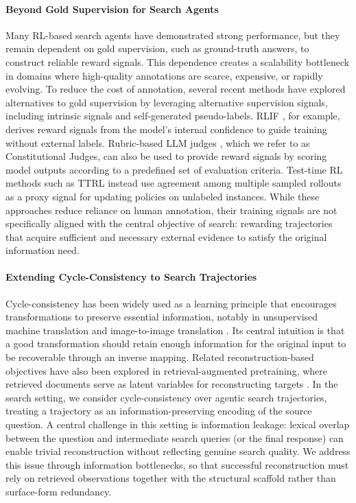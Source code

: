 \paragraph{Beyond Gold Supervision for Search Agents}
Many RL-based search agents have demonstrated strong performance, but they remain dependent on gold supervision, such as ground-truth answers, to construct reliable reward signals. This dependence creates a scalability bottleneck in domains where high-quality annotations are scarce, expensive, or rapidly evolving.
To reduce the cost of annotation, several recent methods have explored alternatives to gold supervision by leveraging alternative supervision signals, including intrinsic signals and self-generated pseudo-labels. RLIF \citep{rlif}, for example, derives reward signals from the model's internal confidence to guide training without external labels.
Rubric-based LLM judges \citep{geval}, which we refer to as Constitutional Judges, can also be used to provide reward signals by scoring model outputs according to a predefined set of evaluation criteria.
Test-time RL methods such as TTRL \citep{ttrl} instead use agreement among multiple sampled rollouts as a proxy signal for updating policies on unlabeled instances. While these approaches reduce reliance on human annotation, their training signals are not specifically aligned with the central objective of search: rewarding trajectories that acquire sufficient and necessary external evidence to satisfy the original information need.

\paragraph{Extending Cycle-Consistency to Search Trajectories}
Cycle-consistency has been widely used as a learning principle that encourages transformations to preserve essential information, notably in unsupervised machine translation \citep{he2016dual, lample2017unsupervised, han2021unsupervised} and image-to-image translation \citep{cyclegan, liu2017unsupervised, huang2018multimodal}. Its central intuition is that a good transformation should retain enough information for the original input to be recoverable through an inverse mapping. Related reconstruction-based objectives have also been explored in retrieval-augmented pretraining, where retrieved documents serve as latent variables for reconstructing targets \citep{guu2020retrieval}. In the search setting, we consider cycle-consistency over agentic search trajectories, treating a trajectory as an information-preserving encoding of the source question. A central challenge in this setting is information leakage: lexical overlap between the question and intermediate search queries (or the final response) can enable trivial reconstruction without reflecting genuine search quality. We address this issue through information bottlenecks, so that successful reconstruction must rely on retrieved observations together with the structural scaffold rather than surface-form redundancy.